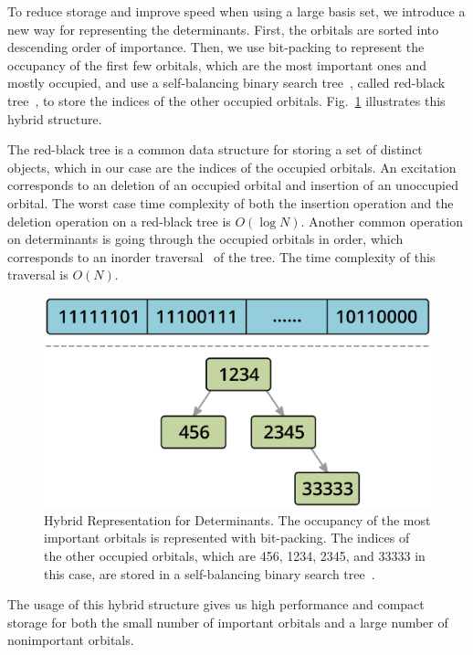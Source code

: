 To reduce storage and improve speed when using a large basis set, we introduce a new way for representing the determinants.
First, the orbitals are sorted into descending order of importance.
Then, we use bit-packing to represent the occupancy of the first few orbitals, which are the most important ones and mostly occupied, and use a self-balancing binary search tree~\cite{wiki:binarysearchtree}, called red-black tree~\cite{wiki:redblacktree}, to store the indices of the other occupied orbitals.
Fig.~\ref{fig:hybrid} illustrates this hybrid structure.

The red-black tree is a common data structure for storing a set of distinct objects, which in our case are the indices of the occupied orbitals.
An excitation corresponds to an deletion of an occupied orbital and insertion of an unoccupied orbital.
The worst case time complexity of both the insertion operation and the deletion operation on a red-black tree is $O(\log N)$.
Another common operation on determinants is going through the occupied orbitals in order, which corresponds to an inorder traversal~\cite{wiki:treetraversal} of the tree.
The time complexity of this traversal is $O(N)$.
\begin{figure}
  \begin{center}
  \includegraphics[width=0.8\linewidth]{figs/HybridDet.eps}
  \end{center}
  \vspace{-0.2cm}
  \caption{Hybrid Representation for Determinants.
  The occupancy of the most important orbitals is represented with bit-packing.
  The indices of the other occupied orbitals, which are 456, 1234, 2345, and 33333 in this case, are stored in a self-balancing binary search tree~\cite{wiki:redblacktree}.
  }
  \label{fig:hybrid}
\end{figure}

The usage of this hybrid structure gives us high performance and compact storage for both the small number of important orbitals and a large number of nonimportant orbitals.

